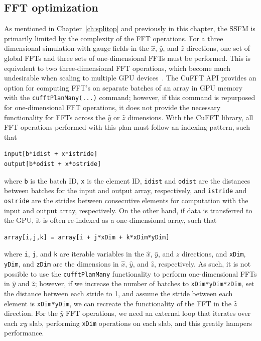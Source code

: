 \subsection{FFT optimization}

As mentioned in Chapter~\ref{ch:splitop} and previously in this chapter, the SSFM is primarily limited by the complexity of the FFT operations.
For a three dimensional simulation with gauge fields in the $\hat x$, $\hat y$, and $\hat z$ directions, one set of global FFTs and three sets of one-dimensional FFTs must be performed.
This is equivalent to two three-dimensional FFT operations, which become much undesirable when scaling to multiple GPU devices~\cite{czechowski2012}.
The CuFFT API provides an option for computing FFT's on separate batches of an array in GPU memory with the \texttt{cufftPlanMany(...)} command; however, if this command is repurposed for one-dimensional FFT operations, it does not provide the necessary functionality for FFTs across the $\hat y$ or $\hat z$ dimensions.
With the CuFFT library, all FFT operations performed with this plan must follow an indexing pattern, such that 

\begin{lstlisting}
input[b*idist + x*istride]
output[b*odist + x*ostride]
\end{lstlisting}

\noindent where \texttt{b} is the batch ID, \texttt{x} is the element ID, \texttt{idist} and \texttt{odist} are the distances between batches for the input and output array, respectively, and \texttt{istride} and \texttt{ostride} are the strides between consecutive elements for computation with the input and output array, respectively.
On the other hand, if data is transferred to the GPU, it is often re-indexed as a one-dimensional array, such that

\begin{lstlisting}
array[i,j,k] = array[i + j*xDim + k*xDim*yDim]
\end{lstlisting}

\noindent where \texttt{i}, \texttt{j}, and \texttt{k} are iterable variables in the $\hat x$, $\hat y$, and $\hat z$ directions, and \texttt{xDim}, \texttt{yDim}, and \texttt{zDim} are the dimensions in $\hat x$, $\hat y$, and $\hat z$, respectively.
As such, it is not possible to use the \texttt{cufftPlanMany} functionality to perform one-dimensional FFTs in $\hat y$ and $\hat z$; however, if we increase the number of batches to \texttt{xDim*yDim*zDim}, set the distance between each stride to 1, and assume the stride between each element is \texttt{xDim*yDim}, we can recreate the functionality of the FFT in the $\hat z$ direction.
For the $\hat y$ FFT operations, we need an external loop that iterates over each $xy$ slab, performing \texttt{xDim} operations on each slab, and this greatly hampers performance.

